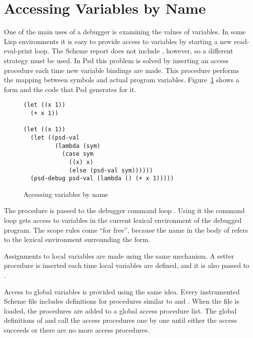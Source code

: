 \section{Accessing Variables by Name}

One of the main uses of a debugger is examining the values of
variables. In some Lisp environments it is easy to provide access to
variables by starting a new read-eval-print loop. The Scheme report
does not include , however, so a different strategy must
be used.  In Psd this problem is solved by inserting an access procedure
each time new variable bindings are made. This procedure performs the
mapping between symbols and actual program variables.
Figure~\ref{fig:access-vars} shows a  form and the code
that Psd generates for it.
\begin{figure}
\begin{verbatim}
(let ((x 1))
  (+ x 1))

(let ((x 1))
  (let ((psd-val 
         (lambda (sym)
           (case sym
             ((x) x)
             (else (psd-val sym))))))
  (psd-debug psd-val (lambda () (+ x 1)))))
\end{verbatim}
  
  \caption{Accessing variables by name}
  \label{fig:access-vars}
\end{figure}

\begin{sloppypar}
The procedure  is passed to the debugger command loop
. Using it the command loop gets access to variables
in the current lexical environment of the debugged program. The scope
rules come ``for free'', because the name
 in the body of  refers to the
lexical environment surrounding the  form.
\end{sloppypar}

Assignments to local variables are made using the same mechanism. A
setter procedure  is inserted each time local
variables are defined, and it is also passed to .

Access to global variables is provided using the same idea. Every
instrumented Scheme file includes definitions for procedures similar
to  and . When the file is loaded,
the procedures are added to a global access procedure list. The global
definitions of  and  call the access
procedures one by one until either the access succeeds or there are no
more access procedures.

